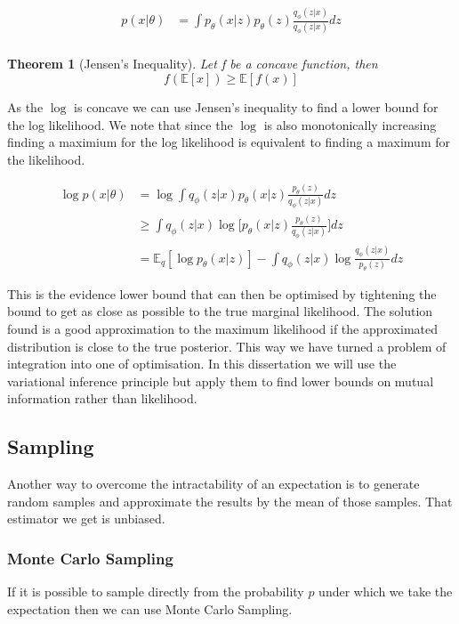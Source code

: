 \documentclass[11pt,oneside,openright]{report}
\newtheorem{theorem}{Theorem}
\begin{document}
\begin{align}
p(x|\theta) &= \int p_\theta(x|z) p_\theta(z) \frac{q_\phi(z|x)}{q_\phi(z|x)}dz \\
\end{align}

\begin{theorem}[Jensen's Inequality]
Let f be a concave function, then
$$ f(\mathbb{E}[x]) \geq \mathbb{E}[f(x)] $$
\end{theorem}

As the $\log$ is concave we can use Jensen's inequality to find a lower bound for the log likelihood. We note that since the $\log$ is also monotonically increasing finding a maximium for the log likelihood is equivalent to finding a maximum for the likelihood.

\begin{align}
\log p(x|\theta) &= \log \int q_\phi(z|x) p_\theta(x|z) \frac{p_\theta(z)}{q_\phi(z|x)}dz\\
	&\geq  \int q_\phi(z|x) \log \Big[  p_\theta(x|z) \frac{p_\theta(z)}{q_\phi(z|x)} \Big]dz\\
	&=  \mathbb{E}_q[\log  p_\theta(x|z)] - \int q_\phi(z|x) \log   \frac{q_\phi(z|x)}{p_\theta(z)}dz
\label{eq:elbo}
\end{align}

This is the evidence lower bound that can then be optimised by tightening the bound to get as close as possible
to the true marginal likelihood. The solution found is a good approximation to the maximum likelihood if the approximated distribution is close to the true posterior. This way we have turned a problem of integration into one of optimisation. In this dissertation we will use the variational inference principle but apply them to find lower bounds on mutual information rather than likelihood.

\subsection{Sampling}
Another way to overcome the intractability of an expectation is to generate random samples and approximate the results by the mean of those samples. That estimator we get is unbiased.

\subsubsection{Monte Carlo Sampling}
If it is possible to sample directly from the probability $p$ under which we take the expectation then we can use Monte Carlo Sampling.
\end{document}
